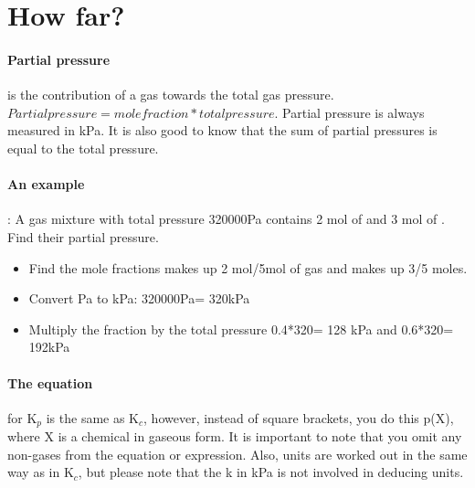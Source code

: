 \section{How far?}
\paragraph{Partial pressure}is the contribution of a gas towards the total gas pressure.
\(Partial pressure=mole fraction* total pressure\). Partial pressure is always measured in kPa. It is also good to know that the sum of partial pressures is equal to the total pressure.
\paragraph{An example}:
A gas mixture with total pressure 320000Pa contains 2 mol of  and 3 mol of . Find their partial pressure.
\begin{itemize}
\item Find the mole fractions
 makes up 2 mol/5mol of gas and  makes up 3/5 moles.
\item Convert Pa to kPa: 320000Pa= 320kPa
\item Multiply the fraction by the total pressure
0.4*320= 128 kPa and 0.6*320= 192kPa 
\end{itemize}
\paragraph{The equation}for K$_p$ is the same as K$_c$, however, instead of square brackets, you do this p(X), where X is a chemical in gaseous form. It is important to note that you omit any non-gases from the equation or expression. Also, units are worked out in the same way as in K$_c$, but please note that the k in kPa is not involved in deducing units.